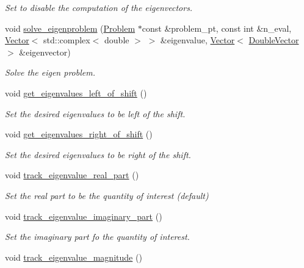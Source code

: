\begin{DoxyCompactItemize}
\begin{DoxyCompactList}\small\item\em Set to disable the computation of the eigenvectors. \end{DoxyCompactList}\item 
void \hyperlink{classoomph_1_1ANASAZI_a5b13a2a77a422033c6a522ec68549fa5}{solve\+\_\+eigenproblem} (\hyperlink{classoomph_1_1Problem}{Problem} $\ast$const \&problem\+\_\+pt, const int \&n\+\_\+eval, \hyperlink{classoomph_1_1Vector}{Vector}$<$ std\+::complex$<$ double $>$ $>$ \&eigenvalue, \hyperlink{classoomph_1_1Vector}{Vector}$<$ \hyperlink{classoomph_1_1DoubleVector}{Double\+Vector} $>$ \&eigenvector)
\begin{DoxyCompactList}\small\item\em Solve the eigen problem. \end{DoxyCompactList}\item 
void \hyperlink{classoomph_1_1ANASAZI_a914ad9d78433c746b46f22bc429db8e9}{get\+\_\+eigenvalues\+\_\+left\+\_\+of\+\_\+shift} ()
\begin{DoxyCompactList}\small\item\em Set the desired eigenvalues to be left of the shift. \end{DoxyCompactList}\item 
void \hyperlink{classoomph_1_1ANASAZI_a1fba291e41996df19379a383befaa4f9}{get\+\_\+eigenvalues\+\_\+right\+\_\+of\+\_\+shift} ()
\begin{DoxyCompactList}\small\item\em Set the desired eigenvalues to be right of the shift. \end{DoxyCompactList}\item 
void \hyperlink{classoomph_1_1ANASAZI_a8c2be3c7a1f810306b1c606ec2d8f90b}{track\+\_\+eigenvalue\+\_\+real\+\_\+part} ()
\begin{DoxyCompactList}\small\item\em Set the real part to be the quantity of interest (default) \end{DoxyCompactList}\item 
void \hyperlink{classoomph_1_1ANASAZI_ab68875d414ab91de32715ab87e20b5ce}{track\+\_\+eigenvalue\+\_\+imaginary\+\_\+part} ()
\begin{DoxyCompactList}\small\item\em Set the imaginary part fo the quantity of interest. \end{DoxyCompactList}\item 
void \hyperlink{classoomph_1_1ANASAZI_a08a235118d10b28a6f03cc9f6d6ca503}{track\+\_\+eigenvalue\+\_\+magnitude} ()

\end{DoxyCompactItemize}
